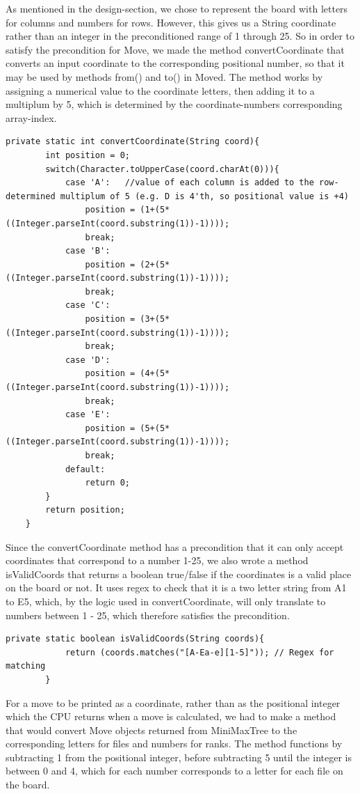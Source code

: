 \documentclass[12pt, a4paper]{article}
\begin{document}
	As mentioned in the design-section, we chose to represent the board with letters for columns and numbers for rows. However, this gives us a String coordinate rather than an integer in the preconditioned range of 1 through 25. So in order to satisfy the precondition for Move, we made the method convertCoordinate that converts an input coordinate to the corresponding positional number, so that it may be used by methods from() and to() in Moved.
	The method works by assigning a numerical value to the coordinate letters, then adding it to a multiplum by 5, which is determined by the coordinate-numbers corresponding array-index.
	\\
	\begin{lstlisting}[style=JavaStyle]
	private static int convertCoordinate(String coord){
		int position = 0;
		switch(Character.toUpperCase(coord.charAt(0))){
			case 'A':   //value of each column is added to the row-determined multiplum of 5 (e.g. D is 4'th, so positional value is +4)
				position = (1+(5*((Integer.parseInt(coord.substring(1))-1))));
				break;
			case 'B':
				position = (2+(5*((Integer.parseInt(coord.substring(1))-1))));
				break;
			case 'C':
				position = (3+(5*((Integer.parseInt(coord.substring(1))-1))));
				break;
			case 'D':
				position = (4+(5*((Integer.parseInt(coord.substring(1))-1))));
				break;
			case 'E':
				position = (5+(5*((Integer.parseInt(coord.substring(1))-1))));
				break;
			default:
				return 0;
		}
		return position;
	}
	\end{lstlisting}
	
	\newpage
	Since the convertCoordinate method has a precondition that it can only accept coordinates that correspond to a number 1-25, we also wrote a method isValidCoords that returns a boolean true/false if the coordinates is a valid place on the board or not. It uses regex to check that it is a two letter string from A1 to E5, which, by the logic used in convertCoordinate, will only translate to numbers between 1 - 25, which therefore satisfies the precondition.

	\begin{lstlisting}[style=JavaStyle]
		private static boolean isValidCoords(String coords){
			return (coords.matches("[A-Ea-e][1-5]")); // Regex for matching
		}
	\end{lstlisting}
	\vspace{10mm}
	For a move to be printed as a coordinate, rather than as the positional integer which the CPU returns when a move is calculated, we had to make a method that would convert Move objects returned from MiniMaxTree to the corresponding letters for files and numbers for ranks. The method functions by subtracting 1 from the positional integer, before subtracting 5 until the integer is between 0 and 4, which for each number corresponds to a letter for each file on the board.
	
\end{document}
